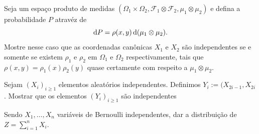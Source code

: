 \begin{exercise}
  Seja um espaço produto de medidas $(\Omega_1 \times \Omega_2, \mathcal{F}_1 \otimes \mathcal{F}_2, \mu_1 \otimes \mu_2)$ e defina a probabilidade $P$ atravéz de
  \begin{equation}
    \mathop{}\!\mathrm{d} P = \rho(x,y) \mathop{}\!\mathrm{d} (\mu_1 \otimes \mu_2).
  \end{equation}
  Mostre nesse caso que as coordenadas canônicas $X_1$ e $X_2$ são independentes se e somente se existem
  $\rho_1$ e $\rho_2$ em $\Omega_1$ e $\Omega_2$ respectivamente, tais que $\rho(x,y) = \rho_1(x) \rho_2(y)$
  quase certamente com respeito a $\mu_1 \otimes \mu_2$.
\end{exercise}



\begin{exercise}
  Sejam $(X_i)_{i \geq 1}$  elementos aleatórios independentes. Definimos $Y_i:=(X_{2i-1},X_{2i}$.
  Mostrar que os elementos $(Y_i)_{i\ge 1}$ são independentes

  \end{exercise}



\begin{exercise}
  Sendo $X_1,\dots, X_n$ variáveis de Bernoulli independentes, dar a distribuição de $Z=\sum_{i=1}^n X_i$.
\end{exercise}






